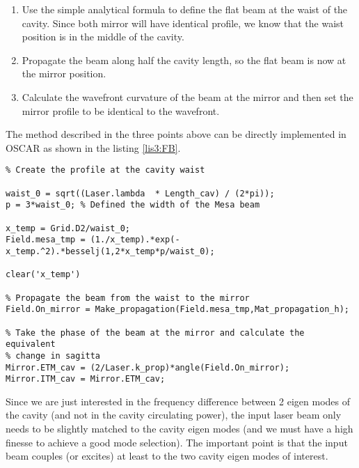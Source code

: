 

\begin{enumerate}
  \item Use the simple analytical formula to define the flat beam at the waist of the cavity. Since both mirror will have identical profile, we know that the waist position is in the middle of the cavity.
  \item Propagate the beam along half the cavity length, so the flat beam is now at the mirror position.
  \item Calculate the wavefront curvature of the beam at the mirror and then set the mirror profile to be identical to the wavefront.
\end{enumerate}

The method described in the three points above can be directly implemented in OSCAR as shown in the listing \ref{lis3:FB}.

\begin{lstlisting}[float=btp,caption=Script to create the mirror profiles used to support a given light field \label{lis3:FB},frame=lines]
%---------------------- Create nearly concentric flat beam -------------------
% Create the profile at the cavity waist

waist_0 = sqrt((Laser.lambda  * Length_cav) / (2*pi));
p = 3*waist_0; % Defined the width of the Mesa beam

x_temp = Grid.D2/waist_0;
Field.mesa_tmp = (1./x_temp).*exp(-x_temp.^2).*besselj(1,2*x_temp*p/waist_0);

clear('x_temp')

% Propagate the beam from the waist to the mirror
Field.On_mirror = Make_propagation(Field.mesa_tmp,Mat_propagation_h);

% Take the phase of the beam at the mirror and calculate the equivalent
% change in sagitta
Mirror.ETM_cav = (2/Laser.k_prop)*angle(Field.On_mirror);
Mirror.ITM_cav = Mirror.ETM_cav;

\end{lstlisting}


Since we are just interested in the frequency difference between 2 eigen modes of the cavity (and not in the cavity circulating power), the input laser beam only needs to be slightly matched to the cavity eigen modes (and we must have a high finesse to achieve a good mode selection). The important point is that the input beam couples (or excites) at least to the two cavity eigen modes of interest.

